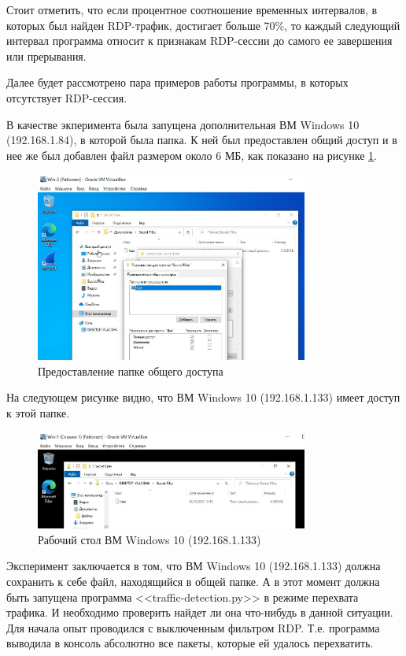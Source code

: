 \documentclass[bachelor, och, coursework]{SCWorks}
\begin{document}
Стоит отметить, что если процентное соотношение временных интервалов, в которых был найден RDP-трафик, достигает больше 70\%, 
то каждый следующий интервал программа
относит к признакам RDP-сессии до самого ее завершения или прерывания.

Далее будет рассмотрено пара примеров работы программы, в которых отсутствует RDP-сессия.

В качестве экперимента была запущена дополнительная ВМ Windows 10 (192.168.1.84), в которой была папка. К ней был предоставлен
общий доступ и в нее же был добавлен файл размером около 6 МБ, как показано
на рисунке \ref{smb-win1}.

\begin{figure}[H]
  \centering
  \includegraphics[width=0.8\textwidth]{photo/smb-win1.jpg}
  \caption{Предоставление папке общего доступа}
  \label{smb-win1}
\end{figure}

На следующем рисунке видно, что ВМ Windows 10 (192.168.1.133) имеет доступ к этой папке.

\begin{figure}[H]
  \centering
  \includegraphics[width=0.8\textwidth]{photo/smb-win2.jpg}
  \caption{Рабочий стол ВМ Windows 10 (192.168.1.133)}
  \label{smb-win2}
\end{figure}

Эксперимент заключается в том, что ВМ Windows 10 (192.168.1.133) должна сохранить к себе файл, находящийся в общей папке.
А в этот момент должна быть запущена программа <<traffic-detection.py>> в режиме перехвата трафика. И необходимо проверить
найдет ли она что-нибудь в данной ситуации. Для начала опыт проводился с выключенным фильтром RDP. Т.е. программа выводила в
консоль абсолютно все пакеты, которые ей удалось перехватить.
\end{document}
